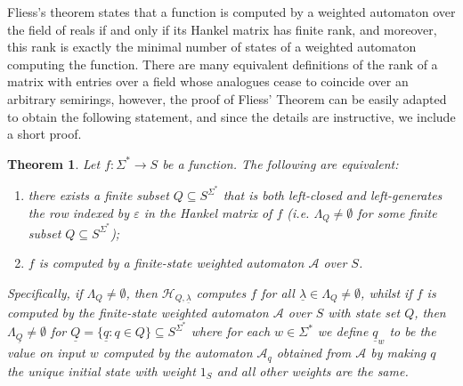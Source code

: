 \documentclass[10pt,a4paper]{amsart}
\newtheorem{thm}{Theorem}[section]
\theoremstyle{definition}
\numberwithin{equation}{section}
\numberwithin{theorem}{section}
\begin{document}
Fliess's theorem \cite{F74} states that a function is computed by a weighted automaton over the field of reals if and only if its Hankel matrix has finite rank, and moreover, this rank is exactly the minimal number of states of a weighted automaton computing the function. There are many equivalent definitions of the rank of a matrix with entries over a field whose analogues cease to coincide over an arbitrary semirings, however, the proof of Fliess' Theorem can be easily adapted to obtain the following statement, and since the details are instructive, we include a short proof.
\begin{thm}
\label{theorem:prelim}
Let $f: \Sigma^* \rightarrow S$ be a function. The following are equivalent:
\begin{enumerate}
\item there exists a finite subset $Q \subseteq S^{\Sigma^*}$ that is both left-closed and left-generates the row indexed by $\varepsilon$ in the Hankel matrix of $f$ (i.e. $\Lambda_Q \neq \emptyset$ for some finite subset $Q\subseteq S^{\Sigma^*}$);
\item $f$ is computed by a finite-state weighted automaton $\mathcal{A}$ over $S$.   
\end{enumerate}
Specifically, if $\Lambda_Q \neq \emptyset$, then $\mathcal{H}_{Q, \underline{\lambda}}$ computes $f$ for all $\underline{\lambda} \in \Lambda_Q \neq \emptyset$, whilst if $f$ is computed by the finite-state weighted automaton $\mathcal{A}$ over $S$ with state set $Q$, then $\Lambda_{\underline{Q}} \neq \emptyset$ for $\underline{Q} = \{\underline{q}: q \in Q\} \subseteq S^{\Sigma^*}$ where for each $w \in \Sigma^*$ we define  $\underline{q}_w$ to be the value on input $w$ computed by the automaton $\mathcal{A}_q$ obtained from $\mathcal{A}$ by making $q$ the unique initial state with weight $1_S$ and all other weights are the same.
\end{thm}
\end{document}
